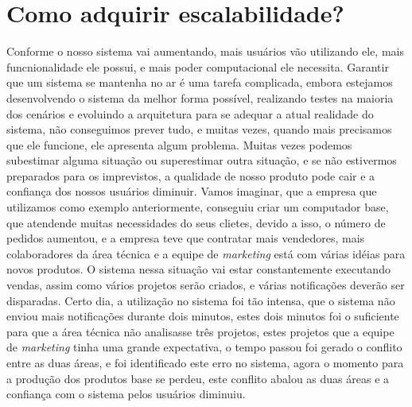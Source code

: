   \section{Como adquirir escalabilidade?}
    Conforme o nosso sistema vai aumentando, mais usuários vão utilizando ele,
    mais funcnionalidade ele possui, e mais poder computacional ele necessita.
    Garantir que um sistema se mantenha no ar é uma tarefa complicada, embora
    estejamos desenvolvendo o sistema da melhor forma possível, realizando testes
    na maioria dos cenários e evoluindo a arquitetura para se adequar a atual
    realidade do sistema, não conseguimos prever tudo, e muitas vezes, quando
    mais precisamos que ele funcione, ele apresenta algum problema. Muitas vezes
    podemos subestimar alguma situação ou superestimar outra situação, e se não
    estivermos preparados para os imprevistos, a qualidade de nosso produto pode
    cair e a confiança dos nossos usuários diminuir. \newline
    Vamos imaginar, que a empresa que utilizamos como exemplo anteriormente,
    conseguiu criar um computador base, que atendende muitas necessidades do seus
    clietes, devido a isso, o número de pedidos aumentou, e a empresa teve que
    contratar mais vendedores, mais colaboradores da área técnica e a equipe de
    \textit{marketing} está com várias idéias para novos produtos. O sistema
    nessa situação vai estar constantemente executando vendas, assim como vários
    projetos serão criados, e várias notificações deverão ser disparadas. Certo
    dia, a utilização no sistema foi tão intensa, que o sistema não enviou mais
    notificações durante dois minutos, estes dois minutos foi o suficiente para
    que a área técnica não analisasse três projetos, estes projetos que a equipe
    de \textit{marketing} tinha uma grande expectativa, o tempo passou foi gerado
    o conflito entre as duas áreas, e foi identificado este erro no sistema,
    agora o momento para a produção dos produtos base se perdeu, este conflito
    abalou as duas áreas e a confiança com o sistema pelos usuários diminuiu.

